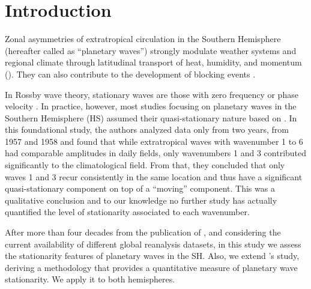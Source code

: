 \documentclass[draft,linenumbers]{agujournal2018}
\begin{document}
\vskip18pt
\section{Introduction}

Zonal asymmetries of extratropical circulation in the Southern
Hemisphere (hereafter called as ``planetary waves'') strongly modulate
weather systems and regional climate through latitudinal transport of
heat, humidity, and momentum (\citet{trenberth1980a}). They can also
contribute to the development of blocking events
\citep[e.g.~][]{trenberth1985}.

In Rossby wave theory, stationary waves are those with zero frequency or
phase velocity \citep{holton2012}. In practice, however, most studies
focusing on planetary waves in the Southern Hemisphere (HS) assumed
their quasi-stationary nature based on \citet{vanloon1972}. In this
foundational study, the authors analyzed data only from two years, from
1957 and 1958 and found that while extratropical waves with wavenumber 1
to 6 had comparable amplitudes in daily fields, only wavenumbers 1 and 3
contributed significantly to the climatological field. From that, they
concluded that only waves 1 and 3 recur consistently in the same
location and thus have a significant quasi-stationary component on top
of a ``moving'' component. This was a qualitative conclusion and to our
knowledge no further study has actually quantified the level of
stationarity associated to each wavenumber.

After more than four decades from the publication of
\citet{vanloon1972}, and considering the current availability of
different global reanalysis datasets, in this study we assess the
stationarity features of planetary waves in the SH. Also, we extend
\citet{vanloon1972}'s study, deriving a methodology that provides a
quantitative measure of planetary wave stationarity. We apply it to both
hemispheres.
\end{document}
